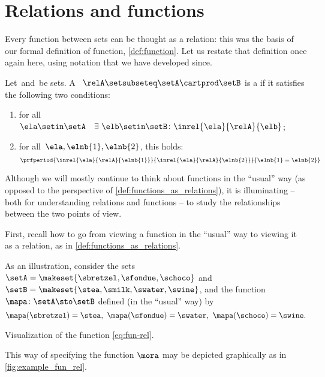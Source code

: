
\section{Relations and functions}

Every function between sets can be thought as a relation: this was the basis of our formal definition of function, \cref{def:function}.
Let us restate that definition once again here, using notation that we have developed since.

\begin{ctdefinition}
    \label{def:functions_as_relations}
    Let~\setA and~\setB be sets.
    A ~$\relA \setsubseteq \setA \cartprod \setB$ is a \emph{} if it satisfies the following two conditions:
    \begin{enumerate}
        \item for all~$\ela \setin \setA \quad \exists \ \elb \setin \setB\colon  \inrel{\ela}{\relA}{\elb}$;
        \item for all~$\ela, \elnb{1}, \elnb{2}$, this holds:
              \begin{equation}
                  \prfperiod{
                      \inrel{\ela}{\relA}{\elnb{1}}
                  }{
                      \inrel{\ela}{\relA}{\elnb{2}}
                  }{
                      \elnb{1} = \elnb{2}
                  }
              \end{equation}
    \end{enumerate}
\end{ctdefinition}

Although we will mostly continue to think about functions in the ``usual'' way (as opposed to the perspective of \cref{def:functions_as_relations}), it is illuminating -- both for understanding relations and functions -- to study the relationships between the two points of view.

First, recall how to go from viewing a function in the ``usual'' way to viewing it as a relation, as in \cref{def:functions_as_relations}.

As an illustration, consider the sets~$\setA = \makeset{ \sbretzel, \sfondue, \schoco }$ and~$\setB = \makeset{ \stea, \smilk, \swater, \swine }$, and the function~$\mapa \colon \setA \sto \setB$ defined (in the ``usual'' way) by
\begin{equation}
    \mapa (\sbretzel) = \stea, \ \mapa (\sfondue) = \swater, \ \mapa(\schoco) = \swine.
\end{equation}
\begin{marginfigure}
    \centering
    \caption{Visualization of the function \cref{eq:fun-rel}.}
    \label{fig:example_fun_rel}
\end{marginfigure}
This way of specifying the function $\mora$ may be depicted graphically as in \cref{fig:example_fun_rel}.

